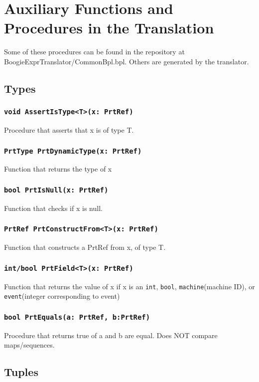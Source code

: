 \documentclass{llncs}
\begin{document}


\pagebreak

\appendix\section{Auxiliary Functions and Procedures in the Translation}
Some of these procedures can be found in the repository at \textsf{BoogieExprTranslator/CommonBpl.bpl}.  Others are generated by the translator.

\subsection {Types} 
\subsubsection{\texttt{void AssertIsType<T>(x: PrtRef)} }
Procedure that asserts that x is of type T.
\subsubsection{\texttt{PrtType PrtDynamicType(x: PrtRef)} } 
Function that returns the type of x 
\subsubsection{\texttt{bool PrtIsNull(x: PrtRef)} }
Function that checks if x is null.
\subsubsection{\texttt{PrtRef PrtConstructFrom<T>(x: PrtRef)} }
Function that constructs a PrtRef from x, of type T.
\subsubsection{\texttt{int/bool PrtField<T>(x: PrtRef)} }
Function that returns the value of x if x is an \texttt{int}, \texttt{bool}, \texttt{machine}(machine ID), or \texttt{event}(integer corresponding to event) 
\subsubsection{\texttt{bool PrtEquals(a: PrtRef, b:PrtRef)} }
Procedure that returns true of a and b are equal. Does NOT compare maps/sequences.
\subsection {Tuples} 
\end{document}
